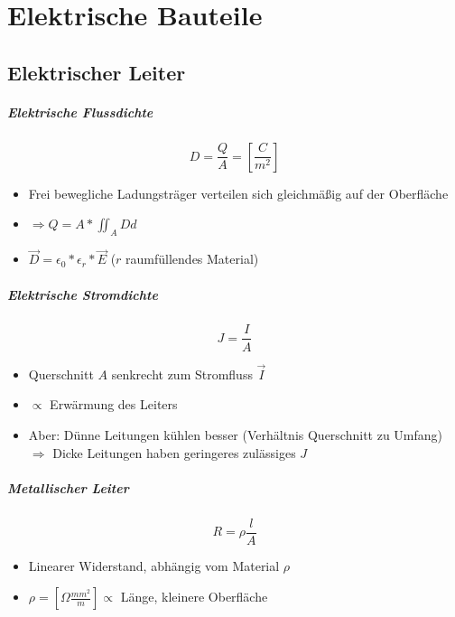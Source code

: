 \chapter{Elektrische Bauteile}

\section{Elektrischer Leiter}

\paragraph{Elektrische Flussdichte}

$$D = \frac{Q}{A} = \left[\frac{C}{m^2}\right]$$

\begin{itemize}
  \item Frei bewegliche Ladungsträger verteilen sich gleichmä\ss ig auf der Oberfläche
  \item $\Rightarrow Q = A * \iint_A Dd$
  \item $\vec{D} = \epsilon_0 * \epsilon_r * \vec{E}$ ($r$ raumfüllendes Material)
\end{itemize}

\paragraph{Elektrische Stromdichte}

$$J = \frac{I}{A}$$

\begin{itemize}
  \item Querschnitt $A$ senkrecht zum Stromfluss $\vec{I}$
  \item $\propto$ Erwärmung des Leiters
  \item Aber: Dünne Leitungen kühlen besser (Verhältnis Querschnitt zu Umfang) $\Rightarrow$ Dicke Leitungen haben geringeres zulässiges $J$
\end{itemize}

\paragraph{Metallischer Leiter}

$$R = \rho \frac{l}{A}$$

\begin{itemize}
  \item Linearer Widerstand, abhängig vom Material $\rho$
  \item $\rho = [\Omega \frac{mm^2}{m}] \propto$ Länge, kleinere Oberfläche
\end{itemize}

